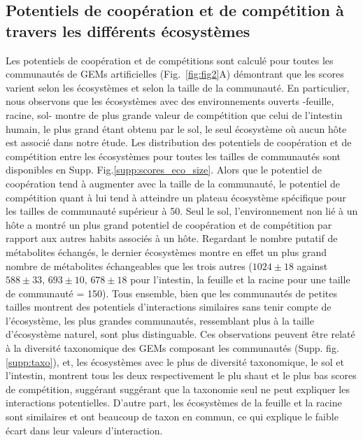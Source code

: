 \subsection{Potentiels de coopération et de compétition à travers les différents écosystèmes} 
Les potentiels de coopération et de compétitions sont calculé pour toutes les communautés de GEMs artificielles (Fig.~\ref{fig:fig2}A) démontrant que les scores varient selon les écosystèmes et selon la taille de la communauté. En particulier, nous observons que les écosystèmes avec des environnements ouverts -feuille, racine, sol- montre de plus grande valeur de compétition que celui de l'intestin humain, le plus grand étant obtenu par le sol, le seul écosystème où aucun hôte est associé dans notre étude. Les distribution des potentiels de coopération et de compétition entre les écosystèmes pour toutes les tailles de communautés sont disponibles en Supp. Fig.\ref{supp:scores_eco_size}. Alors que le potentiel de coopération tend à augmenter avec la taille de la communauté, le potentiel de compétition quant à lui tend à atteindre un plateau écosystème spécifique pour les tailles de communauté supérieur à 50. Seul le sol, l'environnement non lié à un hôte a montré un plus grand potentiel de coopération et de compétition par rapport aux autres habits associés à un hôte. Regardant le nombre putatif de métabolites échangés, le dernier écosystèmes montre en effet un plus grand nombre de métabolites échangeables que les trois autres ($1024\pm 18$ against $588\pm 33$, $693\pm 10$, $678\pm 18$ pour l'intestin, la feuille et la racine pour une taille de communauté = 150). Tous ensemble, bien que les communautés de petites tailles montrent des potentiels d'interactions similaires sans tenir compte de l'écosystème, les plus grandes communautés, ressemblant plus à la taille d'écosystème naturel, sont plus distinguable. Ces observations peuvent être relaté à la diversité taxonomique des GEMs composant les communautés (Supp. fig.\ref{supp:taxo}), et, les écosystèmes avec le plus de diversité taxonomique, le sol et l'intestin, montrent tous les deux respectivement le plu shaut et le plus bas scores de compétition, suggérant suggérant que la taxonomie seul ne peut expliquer les interactions potentielles. D'autre part, les écosystèmes de la feuille et la racine sont similaires et ont beaucoup de taxon en commun, ce qui explique le faible écart dans leur valeurs d'interaction. 

